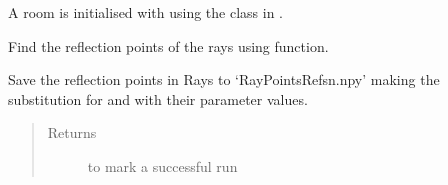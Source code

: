 \documentclass[letterpaper,10pt,english]{sphinxmanual}
\begin{document}
\begin{fulllineitems}
\begin{itemize}
\end{itemize}

A room is initialised with  using the    class in {\hyperref[\detokenize{index:module-Room}]{}}.

Find the reflection points of the rays using    function.

\begin{sphinxVerbatim}[commandchars=\\\{\}]
 
\end{sphinxVerbatim}

Save the reflection points in Rays to   ‘RayPointsRefsn.npy’ making the   substitution for  and  with their parameter values.
\begin{quote}\begin{description}
\item[{Returns}]  to mark a successful run

\end{description}\end{quote}

\end{fulllineitems}

\end{document}
